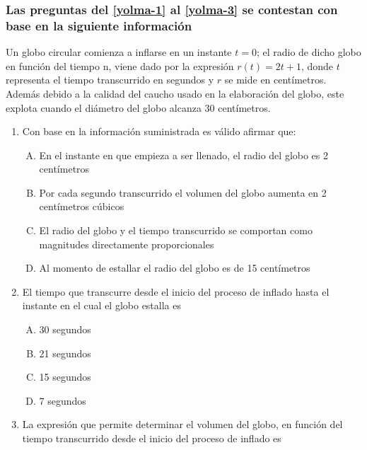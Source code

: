 \subsubsection*{Las preguntas del \ref{yolma-1} al \ref{yolma-3} se contestan con base en la siguiente información}


Un globo circular comienza a inflarse en un instante $t=0$; el radio de dicho globo en función del tiempo n, viene dado por la expresión $r (t)=2t+1$, donde $t$ representa el tiempo transcurrido en segundos y $r$ se mide en centímetros. Además debido a la calidad del caucho usado en la elaboración del globo, este explota cuando el diámetro del globo  alcanza 30 centímetros.\\
\begin{enumerate}

\item Con base en la información suministrada es válido afirmar que:\label{yolma-1}\\



\begin{enumerate}[(A)]
\item  En el instante en que empieza a ser llenado, el radio del globo es 2 centímetros
\item Por cada segundo transcurrido el volumen del globo aumenta en 2 centímetros cúbicos
\item El radio del globo y el tiempo transcurrido se comportan como magnitudes directamente proporcionales
\item Al momento de estallar el radio del globo es de 15 centímetros 
\end{enumerate}


\item  El tiempo que transcurre desde el inicio del proceso de inflado hasta el instante en el cual el globo estalla es  \label{yolma-2}\\

\begin{enumerate}[(A)]
\item  30 segundos
\item 21 segundos
\item 15 segundos
\item 7 segundos
\end{enumerate}


\item  La expresión que permite determinar el volumen del globo, en función del tiempo transcurrido desde el inicio del proceso de inflado es \label{yolma-3}\\


\end{enumerate}
